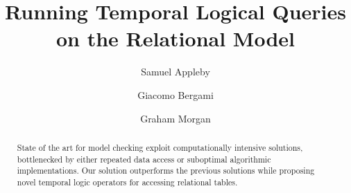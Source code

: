 \documentclass[sigconf]{acmart}
\begin{document}
	\title{Running Temporal Logical Queries on the Relational Model}

\author{Samuel Appleby}


\author{Giacomo Bergami}


\author{Graham Morgan}

	\renewcommand{\shortauthors}{Appleby et al.}

\begin{abstract}
State of the art for model checking exploit computationally intensive solutions, bottlenecked by either repeated data access or suboptimal algorithmic implementations. Our solution outperforms the previous solutions while proposing novel temporal logic operators for accessing relational tables.	
\end{abstract}
\end{document}
